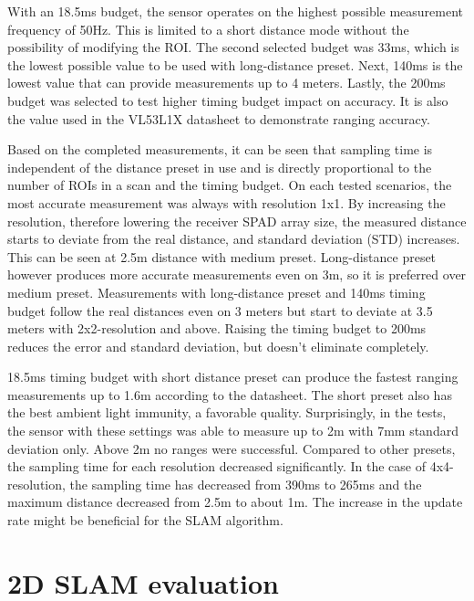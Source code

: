 \documentclass[conference]{IEEEtran}
\begin{document}
With an 18.5ms budget, the sensor operates on the highest possible measurement frequency of 50Hz. This is limited to a  short distance mode without the possibility of modifying the ROI. The second selected budget was 33ms, which is the lowest possible value to be used with long-distance preset. Next, 140ms is the lowest value that can provide measurements up to 4 meters. Lastly, the 200ms budget was selected to test higher timing budget impact on accuracy. It is also the value used in the VL53L1X datasheet\cite{VL53L1XDatasheet} to demonstrate ranging accuracy. 

Based on the completed measurements, it can be seen that sampling time is independent of the distance preset in use and is directly proportional to the number of ROIs in a scan and the timing budget. On each tested scenarios, the most accurate measurement was always with resolution 1x1. By increasing the resolution, therefore lowering the receiver SPAD array size, the measured distance starts to deviate from the real distance, and standard deviation (STD) increases. This can be seen at 2.5m distance with medium preset. Long-distance preset however produces more accurate measurements even on 3m, so it is preferred over medium preset. Measurements with long-distance preset and 140ms timing budget follow the real distances even on 3 meters but start to deviate at 3.5 meters with 2x2-resolution and above. Raising the timing budget to 200ms reduces the error and standard deviation, but doesn't eliminate completely. 

18.5ms timing budget with short distance preset can produce the fastest ranging measurements up to 1.6m according to the datasheet. The short preset also has the best ambient light immunity, a favorable quality. Surprisingly, in the tests, the sensor with these settings was able to measure up to 2m with 7mm standard deviation only. Above 2m no ranges were successful. Compared to other presets, the sampling time for each resolution decreased significantly. In the case of 4x4-resolution, the sampling time has decreased from 390ms to 265ms and the maximum distance decreased from 2.5m to about 1m. The increase in the update rate might be beneficial for the SLAM algorithm. 

\section{2D SLAM evaluation}
\end{document}
